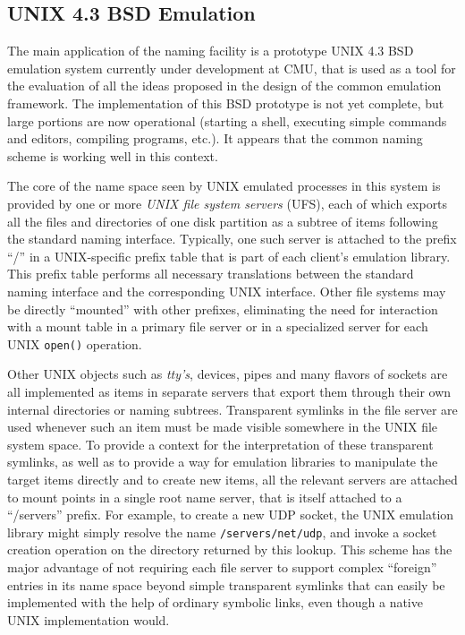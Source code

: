 \subsection{UNIX 4.3 BSD Emulation}

The main application of the naming facility is a prototype UNIX 4.3
BSD emulation system currently under development at CMU, that is used
as a tool for the evaluation of all the ideas proposed in the design
of the common emulation framework.  The implementation of this BSD
prototype is not yet complete, but large portions are now operational
(starting a shell, executing simple commands and editors, compiling
programs, etc.).  It appears that the common naming scheme is working
well in this context.

The core of the name space seen by UNIX emulated processes in this
system is provided by one or more {\em UNIX file system servers}
(UFS), each of which exports all the files and directories of one disk
partition as a subtree of items following the standard naming
interface. Typically, one such server is attached to the prefix ``/''
in a UNIX-specific prefix table that is part of each client's
emulation library. This prefix table performs all necessary
translations between the standard naming interface and the
corresponding UNIX interface.  Other file systems may be directly
``mounted'' with other prefixes, eliminating the need for interaction
with a mount table in a primary file server or in a specialized server
for each UNIX {\tt open()} operation. 

Other UNIX objects such as {\em tty's}, devices, pipes and many
flavors of sockets are all implemented as items in separate servers
that export them through their own internal directories or naming
subtrees. Transparent symlinks in the file server are used whenever
such an item must be made visible somewhere in the UNIX file system
space. To provide a context for the interpretation of these
transparent symlinks, as well as to provide a way for emulation
libraries to manipulate the target items directly and to create new
items, all the relevant servers are attached to mount points in a
single root name server, that is itself attached to a ``/servers''
prefix. For example, to create a new UDP socket, the UNIX emulation
library might simply resolve the name {\tt /servers/net/udp}, and
invoke a socket creation operation on the directory returned by this
lookup. This scheme has the major advantage of not requiring each file
server to support complex ``foreign'' entries in its name space beyond
simple transparent symlinks that can easily be implemented with the
help of ordinary symbolic links, even though a native UNIX
implementation would.

